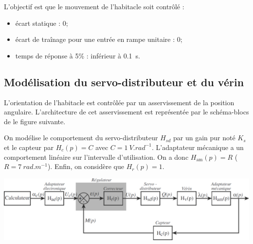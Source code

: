\begin{multicols}{2}
\begin{multicols}{2}
\begin{obj}
L'objectif est que le mouvement de l'habitacle soit contrôlé :
\begin{itemize}
\item écart statique : 0\degres;
\item écart de traînage pour une entrée en rampe unitaire : 0\degres;
\item temps de réponse à 5\% : inférieur à \SI{0,1}{s}.

\end{itemize}
\end{obj}

\subsection*{Modélisation du servo-distributeur et du vérin}

L'orientation de l'habitacle est contrôlée par un asservissement de la position angulaire. L'architecture de cet asservissement est représentée par le schéma-blocs de le figure suivante.

On modélise le comportement du servo-distributeur $H_{sd}$ par un gain pur noté $K_s$ et le capteur par $H_c(p)=C$ avec $C=\SI{1}{V.rad^{-1}}$.  L'adaptateur mécanique a un comportement linéaire sur l'intervalle d'utilisation. On a donc $H_{\text{am}}(p)=R$ ($R=\SI{7}{rad.m^{-1}}$). Enfin, on considère que $H_r(p)=1$. 

\begin{center}
\includegraphics[width=\linewidth]{images/fig_05}
\end{center}


\end{multicols}
\end{multicols}
